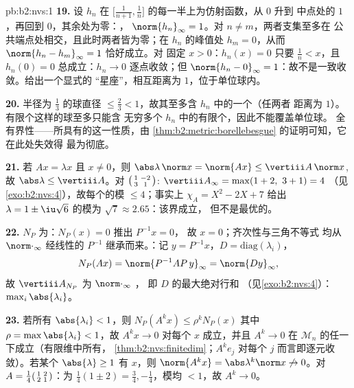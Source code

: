 \begin{solution}{pb:b2:nvs:1}
\textbf{19.} 设 $h_n$ 在
$\bigl[\frac1{n+1}, \frac1n\bigr]$ 的每一半上为仿射函数，从 $0$ 升到
中点处的 $1$，再回到 $0$，其余处为零：，
$\norm{h_n}_\infty = 1$。对 $n \neq m$，两者支集至多在
公共端点处相交，且此时两者皆为零；在
$h_n$ 的峰值处 $h_m = 0$，从而 $\norm{h_n - h_m}_\infty = 1$ 恰好成立。对
固定 $x > 0$：$h_n(x) = 0$ 只要 $\frac1n < x$，且
$h_n(0) = 0$ 总成立：$h_n \to 0$ 逐点收敛；但
$\norm{h_n - 0}_\infty = 1$：故不是一致收敛。给出一个显式的
“星座”，相互距离为 $1$，位于单位球内。

\textbf{20.} 半径为 $\frac13$ 的球直径 $\leq
\frac23 < 1$，故其至多含 $h_n$ 中的一个（任两者
距离为 $1$）。有限个这样的球至多只能含
无穷多个 $h_n$ 中的有限个，因此不能覆盖单位球。
全有界性——所具有的这一性质，由
\cref{thm:b2:metric:borellebesgue} 的证明可知，它在此处失效得
最为彻底。

\textbf{21.} 若 $Ax = \lambda x$ 且 $x \neq 0$，则
$\abs\lambda\,\norm x = \norm{Ax} \leq \vertiii A\,\norm x$,
故 $\abs\lambda \leq \vertiii A$。对
$\begin{psmallmatrix}1 & -2\\ 3 & 1\end{psmallmatrix}$:
$\vertiii A_\infty = \max(1 + 2,\ 3 + 1) = 4$
（见\cref{exo:b2:nvs:4}），故每个的模 $\leq
4$；事实上 $\chi_A = X^2 - 2X + 7$ 给出 $\lambda = 1 \pm
\iu\sqrt6$ 的模为 $\sqrt7 \approx 2.65$：该界成立，
但不是最优的。

\textbf{22.} $N_P$ 为：$N_P(x) = 0$ 推出 $P^{-1}x = 0$，
故 $x = 0$；齐次性与三角不等式
均从 $\norm\cdot_\infty$ 经线性的 $P^{-1}$ 继承而来。：记 $y = P^{-1}x$，$D = \mathrm{diag}(\lambda_i)$，
\[
N_P(Ax) = \norm{P^{-1}AP\,y}_\infty = \norm{Dy}_\infty,
\]
故 $\vertiii A_{N_P}$ 为 $\norm\cdot_\infty$ ，
即 $D$ 的最大绝对行和
（见\cref{exo:b2:nvs:4}）：$\max_i\abs{\lambda_i}$。

\textbf{23.} 若所有 $\abs{\lambda_i} < 1$，则 $N_P(A^kx) \leq
\rho^kN_P(x)$ 其中 $\rho = \max\abs{\lambda_i} < 1$，故 $A^kx
\to 0$ 对每个 $x$ 成立，并且 $A^k \to 0$ 在
$\mathcal{M}_n$ 的任一下成立（有限维中所有，
\cref{thm:b2:nvs:finitedim}；$A^ke_j$ 对每个
$j$ 而言即逐元收敛）。若某个 $\abs{\lambda} \geq 1$
有 $x$，则 $\norm{A^kx} = \abs\lambda^k\norm x
\not\to 0$。对 $A = \frac14\begin{psmallmatrix}1 & 2\\ 2 &
1\end{psmallmatrix}$：为 $\frac14(1 \pm 2) =
\frac34, -\frac14$，模均 $< 1$，故 $A^k \to 0$。


\end{solution}
